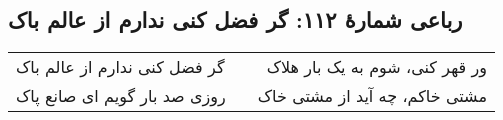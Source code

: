 \begin{center}
\section*{رباعی شمارهٔ ۱۱۲: گر فضل کنی ندارم از عالم باک}
\label{sec:112}
\begin{longtable}{l p{0.5cm} r}
گر فضل کنی ندارم از عالم باک
&&
ور قهر کنی، شوم به یک بار هلاک
\\
روزی صد بار گویم ای صانع پاک
&&
مشتی خاکم، چه آید از مشتی خاک
\\
\end{longtable}
\end{center}
